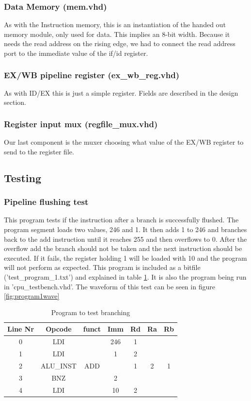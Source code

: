\documentclass[11pt]{report}
\begin{document}
\subsubsection*{Data Memory (mem.vhd)}
As with the Instruction memory, this is an instantiation of the handed out memory
module, only used for data. This implies an 8-bit width. Because it needs the read address
on the rising edge, we had to connect the read address port to the immediate value of the
if/id register.
\subsubsection*{EX/WB pipeline register (ex\_wb\_reg.vhd)}
As with ID/EX this is just a simple register. Fields are described in the design section.
\subsubsection*{Register input mux (regfile\_mux.vhd)}
Our last component is the muxer choosing what value of the EX/WB register to send to the
register file. 


\subsection*{Testing}

\subsubsection*{Pipeline flushing test}

This program tests if the instruction after a branch is successfully flushed.
The program segment loads two values, 246 and 1. It then adds 1 to 246 and
branches back to the add instruction until it reaches 255 and then overflows
to 0. After the overflow add the branch should not be taken and the next instruction
should be executed. If it fails, the register holding 1 will be loaded with 10
and the program will not perform as expected. This program is included as a bitfile
('test\_program\_1.txt') and explained in table \ref{tab:program1table}. It is also the 
program being run in 'cpu\_testbench.vhd'.
The waveform of this test can be seen in figure \ref{fig:program1wave}

\begin{table}[htbp]
  \centering
  \begin{tabular}{|c|c|c|c|c|c|c|}
    \hline
    Line Nr &	Opcode		&	funct	&	Imm	&	Rd	&	Ra	&	Rb	\\\hline
    	0	&	LDI			&			&	246	&	1	&		&		\\\hline
    	1	&	LDI			&			&	1	&	2	&		&		\\\hline
    	2	&	ALU\_INST	&	ADD		&		&	1	&	2	&	1	\\\hline
    	3	&	BNZ			&			&	2	&		&		&		\\\hline
    	4	&	LDI			&			&	10	&	2	&		&		\\\hline
  \end{tabular}
  \caption{Program to test branching}
  \label{tab:program1table}
\end{table}
\end{document}

